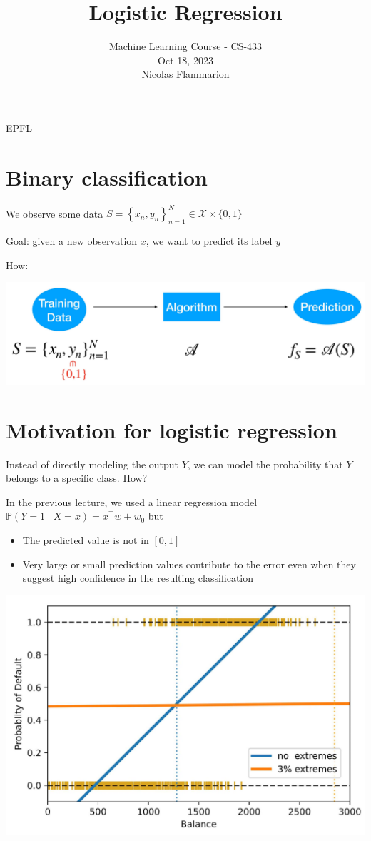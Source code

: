 \documentclass[10pt]{article}
\title{Logistic Regression }
\author{Machine Learning Course - CS-433\\
Oct 18, 2023\\
Nicolas Flammarion}
\date{}
\begin{document}
\maketitle
EPFL

\section*{Binary classification}
We observe some data $S=\left\{x_{n}, y_{n}\right\}_{n=1}^{N} \in \mathscr{X} \times\{0,1\}$

Goal: given a new observation $x$, we want to predict its label $y$

How:

\begin{center}
\includegraphics[max width=\textwidth]{2023_12_30_261a5c67f471a6c49904g-02}
\end{center}

\section*{Motivation for logistic regression}
Instead of directly modeling the output $Y$, we can model the probability that $Y$ belongs to a specific class. How?

In the previous lecture, we used a linear regression model $\mathbb{P}(Y=1 \mid X=x)=x^{\top} w+w_{0}$ but

\begin{itemize}
  \item The predicted value is not in $[0,1]$
  \item Very large or small prediction values contribute to the error even when they suggest high confidence in the resulting classification
\end{itemize}

\begin{center}
\includegraphics[max width=\textwidth]{2023_12_30_261a5c67f471a6c49904g-03}
\end{center}
\end{document}
